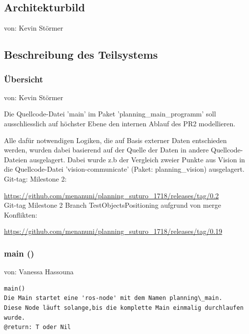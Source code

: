 \documentclass{suturo}
\makeatletter
\newcommand{\chapterauthor}[1]{%
  {\parindent0pt\vspace*{-27pt}%
  \linespread{0}\small\begin{flushright}von: #1\end{flushright}%
  \par\nobreak\vspace*{0pt}}
  \@afterheading%
}
\makeatother
\begin{document}
\subsection{Architekturbild}
\chapterauthor{Kevin Störmer}


\begin{figure}[!htb]
\end{figure}



\subsection{Beschreibung des Teilsystems}
\subsubsection{\"Ubersicht}
\chapterauthor{Kevin Störmer}
Die Quellcode-Datei 'main' im Paket 'planning\_main\_programm' soll ausschliesslich auf höchster Ebene den internen Ablauf des PR2 modellieren. 

Alle dafür notwendigen Logiken, die auf Basis externer Daten entschieden werden, wurden dabei basierend auf der Quelle der Daten in andere Quellcode-Dateien ausgelagert. Dabei wurde z.b der Vergleich zweier Punkte aus Vision in die Quellcode-Datei 'vision-communicate' (Paket: planning\_vision) ausgelagert. \\


Git-tag: Milestone 2:

\url{https://github.com/menanuni/planning_suturo_1718/releases/tag/0.2} \\

Git-tag Milestone 2 Branch TestObjectsPositioning aufgrund von merge Konflikten:

\url{https://github.com/menanuni/planning_suturo_1718/releases/tag/0.19}\\

\subsubsection{main ()}
\chapterauthor{Vanessa Hassouna}
\begin{verbatim}
main()
Die Main startet eine 'ros-node' mit dem Namen planning\_main.
Diese Node läuft solange,bis die komplette Main einmalig durchlaufen wurde. 
@return: T oder Nil 
\end{verbatim}
\end{document}
